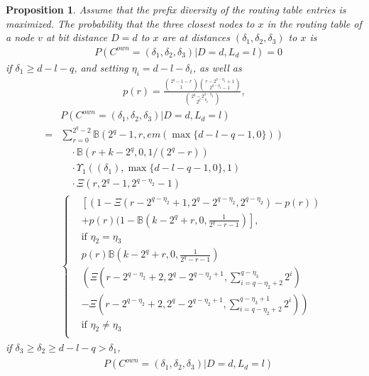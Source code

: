 \documentclass[10pt, conference, compsocconf, letterpaper]{IEEEtran}
\renewcommand{\binom}{\mathbb{B}}
\renewcommand{\over}{\Xi}
\newcommand{\best}{\Upsilon}
\newtheorem{proposition}{Proposition}
\begin{document}
\vspace{3pt}
\begin{proposition}
\label{prop:s4}
Assume that the prefix diversity of the routing table entries is maximized.
The probability that the three closest nodes to $x$ in the routing table of a node $v$
at bit distance $D=d$ to $x$ are at distances $(\delta_1,\delta_2, \delta_3)$ to $x$ is
\begin{align}
\label{eq:alpha1}
&P\left(C^{own}=(\delta_1, \delta_2, \delta_3)|D=d,L_d=l\right) = 0
\end{align}
if $\delta_1 \geq d-l-q$, and setting $\eta_i=d-l-\delta_i$, 
as well as
\begin{align*}
p(r) = \frac{{2^q -1-r \choose 1}{r - 2^{q-\eta_2}+1 \choose 2^{q-\eta_2}-1}}
{{2^q-2^{q-\eta_2} \choose 2^{q-\eta_2}}},
\end{align*}
\begin{align}
\label{eq:alpha2}
&P\left(C^{own}=(\delta_1, \delta_2,\delta_3)|D=d,L_d=l\right) \nonumber\\
 =& \sum_{r=0}^{2^q-2}\binom(2^q-1,r,em(\max\{d-l-q-1,0\})) \nonumber\\
 &\quad\cdot \binom(r+k-2^q,0,1/(2^q-r)) \nonumber\\
&\quad \cdot \best_1((\delta_1),\max\{d-l-q-1,0\},1)\\
&\quad \cdot \over(r,2^q-1,2^{q-\eta_2}-1) \nonumber\\
&\begin{cases}
& \left[ 
\left(1-\over(r-2^{q-\eta_2}+1,2^q-2^{q-\eta_2}, 2^{q-\eta_2})-p(r)\right) \right. \\
&\left. +p(r)(1-\binom(k-2^q+r,0,\frac{1}{2^q-r-1})\right], \\
&\text{if }\eta_2=\eta_3 \\
&p(r) \binom(k-2^q+r,0,\frac{1}{2^q-r-1}) \\
&\left(\over(r-2^{q-\eta_2}+2,2^q-2^{q-\eta_2+1}, \sum_{i=q-\eta_2+2}^{q-\eta_3}2^i) \right. \\
& \left. -  \over(r-2^{q-\eta_2}+2,2^q-2^{q-\eta_2+1}, \sum_{i=q-\eta_2+2}^{q-\eta_3+1}2^i)\right) \\
&\text{if }\eta_2\neq \eta_3 \\
\end{cases}
\nonumber
\end{align}
if $\delta_3 \geq \delta_2 \geq d-l-q > \delta_1$, 
\begin{align}
\label{eq:alpha3}
\begin{split}
&P\left(C^{own}=(\delta_1, \delta_2, \delta_3)|D=d,L_d=l\right) \\

\end{split}
\end{align}
\end{proposition}
\end{document}
